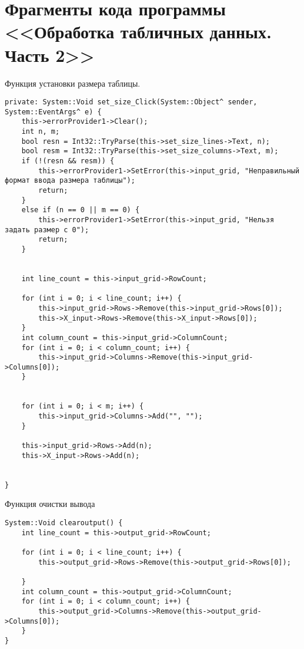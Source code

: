 \section{Фрагменты кода программы <<Обработка табличных данных. Часть 2>>}
\label{app:table_data_2}

Функция установки размера таблицы.
\begin{verbatim}
private: System::Void set_size_Click(System::Object^ sender, System::EventArgs^ e) {
	this->errorProvider1->Clear();
	int n, m;
	bool resn = Int32::TryParse(this->set_size_lines->Text, n);
	bool resm = Int32::TryParse(this->set_size_columns->Text, m);
	if (!(resn && resm)) {
		this->errorProvider1->SetError(this->input_grid, "Неправильный формат ввода размера таблицы");
		return;
	}
	else if (n == 0 || m == 0) {
		this->errorProvider1->SetError(this->input_grid, "Нельзя задать размер с 0");
		return;
	}


	int line_count = this->input_grid->RowCount;
	
	for (int i = 0; i < line_count; i++) {
		this->input_grid->Rows->Remove(this->input_grid->Rows[0]);
		this->X_input->Rows->Remove(this->X_input->Rows[0]);
	}
	int column_count = this->input_grid->ColumnCount;
	for (int i = 0; i < column_count; i++) {
		this->input_grid->Columns->Remove(this->input_grid->Columns[0]);
	}
	
	
	for (int i = 0; i < m; i++) {
		this->input_grid->Columns->Add("", "");
	}
	
	this->input_grid->Rows->Add(n);
	this->X_input->Rows->Add(n);
	
	
}
\end{verbatim}

Функция очистки вывода
\begin{verbatim}
System::Void clearoutput() {
	int line_count = this->output_grid->RowCount;

	for (int i = 0; i < line_count; i++) {
		this->output_grid->Rows->Remove(this->output_grid->Rows[0]);

	}
	int column_count = this->output_grid->ColumnCount;
	for (int i = 0; i < column_count; i++) {
		this->output_grid->Columns->Remove(this->output_grid->Columns[0]);
	}
}
\end{verbatim}

